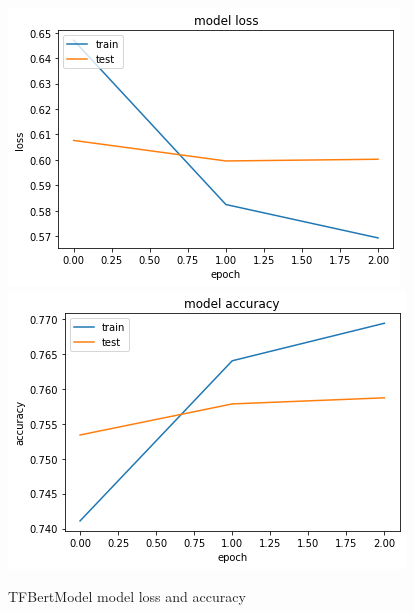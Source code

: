 \documentclass[12pt]{article}
\begin{document}
\begin{figure}[h!]
    \centering
    \includegraphics{trans_loss.png}
    \includegraphics{trans_acc.png}
    \caption{TFBertModel model loss and accuracy}
    \label{fig:tr}
\end{figure}
\end{document}
